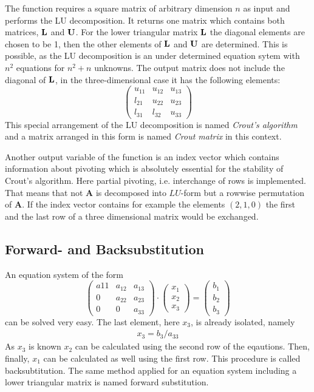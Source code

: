 The function  requires a square matrix of arbitrary
dimension $n$ as input and performs the LU decomposition. It returns one
matrix which contains both matrices, ${\bf L}$ and ${\bf U}$. 
For the lower triangular matrix  ${\bf L}$ the diagonal elements 
are chosen to be 1, then the other elements of ${\bf L}$ and ${\bf U}$
are determined. This is possible, as the LU decomposition is an under
determined equation sytem with $n^2$ equations for $n^2+n$ unknowns. 
The output matrix does not include the diagonal of ${\bf L}$, in the
three-dimensional case it has the following elements:
\[ \left(
  \begin{array}{ccc}
    u_{11} & u_{12} & u_{13} \\
    l_{21} & u_{22} & u_{23} \\
    l_{31} & l_{32} & u_{33}
    \end{array} \right)
\]
This special arrangement of the LU decomposition is named {\sl
Crout's algorithm} and a matrix arranged in this form is named {\sl
Crout matrix} in this context.
  

Another output variable of the function  is an index
vector which contains information about pivoting which is absolutely
essential for the stability of
Crout's algorithm. Here partial pivoting,
i.e. interchange of rows is implemented. That means that not {\bf A} is
decomposed into $LU$-form but a rowwise permutation of {\bf A}. If the
index vector contains for example the elements $(2,1,0)$ the first and
the last row of a three dimensional matrix would be exchanged.


\subsection{Forward- and Backsubstitution}
\label{sec:lin_alg:backsub}
An equation system of the form
\[ 
\left(
  \begin{array}{ccc}
    a{11} & a_{12} & a_{13} \\
    0 & a_{22} & a_{23}\\
    0 & 0 & a_{33}
    \end{array} \right)
\cdot
\left(
  \begin{array}{c}
    x_1\\x_2\\x_3
 \end{array} \right)
=
\left(
  \begin{array}{c}
    b_1\\b_2\\b_3
 \end{array} \right)
\]
can be solved very easy. The last element, here $x_3$, is already isolated,
namely
\begin{eqnarray}
  x_3 = b_3/a_{33}
\end{eqnarray}
As $x_3$ is known $x_2$ can be calculated using the second row of the
eqautions. Then, finally, $x_1$ can be calculated as well using the
first row. This procedure
is called backsubtitution. The same
method  applied for an equation system including a
lower triangular matrix is named forward substitution.   

